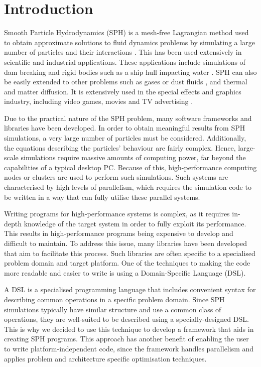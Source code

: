 \chapter{Introduction}

Smooth Particle Hydrodynamics (SPH) is a mesh-free Lagrangian method used to obtain approximate solutions to fluid dynamics problems by simulating a large number of particles and their interactions \cite{liu2010smoothed}. This has been used extensively in scientific and industrial applications. These applications include simulations of dam breaking \cite{monaghan1994simulating} and rigid bodies such as a ship hull impacting water \cite{veen2010smoothed}. SPH can also be easily extended to other problems such as gases or dust fluids \cite{monaghan1995sph}, and thermal and matter diffusion. It is extensively used in the special effects and graphics industry, including video games, movies and TV advertising \cite{monaghan2005sph}.

Due to the practical nature of the SPH problem, many software frameworks and libraries have been developed. In order to obtain meaningful results from SPH simulations, a very large number of particles must be considered. Additionally, the equations describing the particles' behaviour are fairly complex. Hence, large-scale simulations require massive amounts of computing power, far beyond the capabilities of a typical desktop PC. Because of this, high-performance computing nodes or clusters are used to perform such simulations. Such systems are characterised by high levels of parallelism, which requires the simulation code to be written in a way that can fully utilise these parallel systems.

Writing programs for high-performance systems is complex, as it requires in-depth knowledge of the target system in order to fully exploit its performance. This results in high-performance programs being expensive to develop and difficult to maintain. To address this issue, many libraries have been developed that aim to facilitate this process. Such libraries are often specific to a specialised problem domain and target platform. One of the techniques to making the code more readable and easier to write is using a Domain-Specific Language (DSL). 

A DSL is a specialised programming language that includes convenient syntax for describing common operations in a specific problem domain. Since SPH simulations typically have similar structure and use a common class of operations, they are well-suited to be described using a specially-designed DSL. This is why we decided to use this technique to develop a framework that aids in creating SPH programs. This approach has another benefit of enabling the user to write platform-independent code, since the framework handles parallelism and applies problem and architecture specific optimisation techniques.

